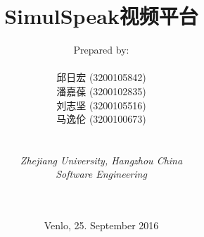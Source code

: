 
\def\Company{Consultancy}
\def\Institute{\textit{Zhejiang University, Hangzhou China}}
\def\Course{\textit{Software Engineering}}
\def\Module{\textit{ }}
\def\Docent{\textit{}}
\def\Assistant{\textit{}}

\def\BoldTitle{SimulSpeak视频平台}

\def\Authors{Prepared by:\\\\ 邱日宏 (3200105842) \\ 潘嘉葆 (3200102835) \\ 刘志坚 (3200105516) \\ 马逸伦 (3200100673) } 


\title{\textbf{\BoldTitle}}
\author{\Authors \\ \\ \\ \Institute\\ \Course\\ \Module\\ \Docent\\ \Assistant}
\date{Venlo, 25. September 2016}

